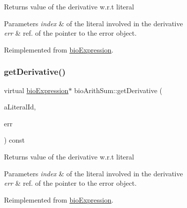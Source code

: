 \begin{DoxyReturn}{Returns}
value of the derivative w.\+r.\+t literal 
\end{DoxyReturn}

\begin{DoxyParams}{Parameters}
{\em index} & of the literal involved in the derivative \\
\hline
{\em err} & ref. of the pointer to the error object. \\
\hline
\end{DoxyParams}


Reimplemented from \hyperlink{classbio_expression_a5915579d1193f25f216c1e273c97f2ce}{bio\+Expression}.

\mbox{\label{classbio_arith_sum_a2c030d0fea64581fe6f33031d3d3c977}} 
\subsubsection{\texorpdfstring{get\+Derivative()}{getDerivative()}\hspace{0.1cm}{\footnotesize\ttfamily [2/4]}}
{\footnotesize\ttfamily virtual \hyperlink{classbio_expression}{bio\+Expression}$\ast$ bio\+Arith\+Sum\+::get\+Derivative (\begin{DoxyParamCaption}\item[{pat\+U\+Long}]{a\+Literal\+Id,  }\item[{pat\+Error $\ast$\&}]{err }\end{DoxyParamCaption}) const\hspace{0.3cm}{\ttfamily [virtual]}}

\begin{DoxyReturn}{Returns}
value of the derivative w.\+r.\+t literal 
\end{DoxyReturn}

\begin{DoxyParams}{Parameters}
{\em index} & of the literal involved in the derivative \\
\hline
{\em err} & ref. of the pointer to the error object. \\
\hline
\end{DoxyParams}


Reimplemented from \hyperlink{classbio_expression_a5915579d1193f25f216c1e273c97f2ce}{bio\+Expression}.

\mbox{\label{classbio_arith_sum_a2c030d0fea64581fe6f33031d3d3c977}} 
